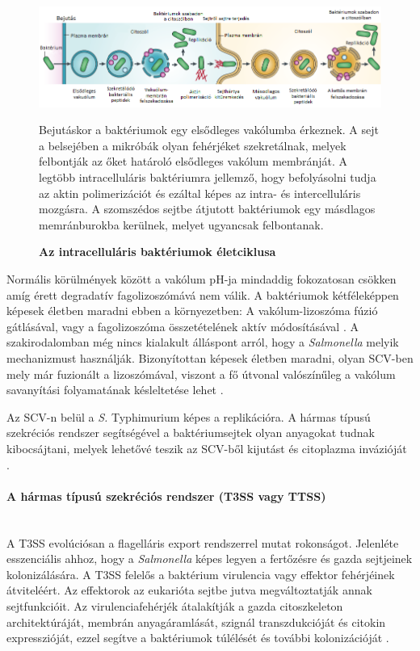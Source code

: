 \documentclass[a4paper,12pt]{article}
\newenvironment{imgdesc}{
		\small
		\singlespacing
		\begin{center}

	}{
		\end{center}
	}
\begin{document}
		 \begin{figure}[H]
			 \centering
			 \includegraphics[scale=0.7]{img/intracell_bakt_terj_am.png}
			 \caption{\textbf{Az intracelluláris baktériumok életciklusa}}
			 \begin{imgdesc}
				 Bejutáskor a baktériumok egy elsődleges vakólumba érkeznek. A sejt a belsejében a mikróbák olyan fehérjéket szekretálnak, melyek felbontják az őket határoló elsődleges vakólum membránját. A legtöbb intracelluláris baktériumra jellemző, hogy befolyásolni tudja az aktin polimerizációt és ezáltal képes az intra- és intercelluláris mozgásra. A szomszédos sejtbe átjutott baktériumok egy másdlagos memránburokba kerülnek, melyet ugyancsak felbontanak.
			 \end{imgdesc}
			 \label{fig:salmo_cycle}
		 \end{figure}

		 Normális körülmények között a vakólum pH-ja mindaddig fokozatosan csökken amíg érett degradatív fagolizoszómává nem válik. A baktériumok kétféleképpen képesek életben maradni ebben a környezetben: A vakólum-lizoszóma fúzió gátlásával, vagy a fagolizoszóma összetételének aktív módosításával \cite{salmonella_autophagy_nature_old}. A szakirodalomban még nincs kialakult álláspont arról, hogy a \textit{Salmonella} melyik mechanizmust használják. Bizonyítottan képesek életben maradni, olyan SCV-ben mely már fuzionált a lizoszómával, viszont a fő útvonal valószínűleg a vakólum savanyítási folyamatának késleltetése lehet \cite{salmonella_and_host_cell_nature}.

		 Az SCV-n belül a \textit{S.} Typhimurium képes a replikációra. A hármas típusú szekréciós rendszer segítségével a baktériumsejtek olyan anyagokat tudnak kibocsájtani, melyek lehetővé teszik az SCV-ből kijutást és citoplazma invázióját \cite{salmonella_authopagy_intro}.

		 \paragraph{A hármas típusú szekréciós rendszer (T3SS vagy TTSS)} \mbox{}\\
		 A T3SS evolúciósan a flagelláris export rendszerrel mutat rokonságot. Jelenléte esszenciális ahhoz, hogy a \textit{Salmonella} képes legyen a fertőzésre és gazda sejtjeinek kolonizálására. A T3SS felelős a baktérium virulencia vagy effektor fehérjéinek átviteléért. Az effektorok az eukarióta sejtbe jutva megváltoztatják annak sejtfunkcióit. Az virulenciafehérjék átalakítják a gazda citoszkeleton architektúráját, membrán anyagáramlását, szignál transzdukcióját és citokin expresszióját, ezzel segítve a baktériumok túlélését és további kolonizációját \cite{salmonella_and_host_cell_nature}.
\end{document}
